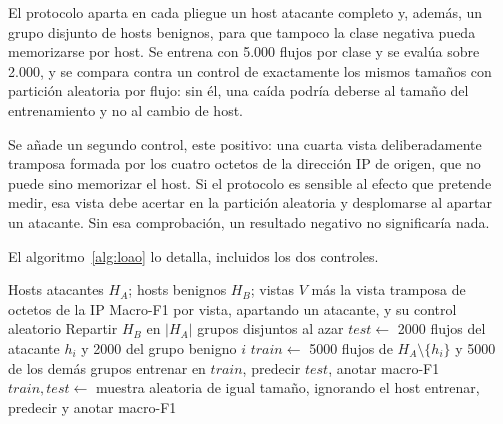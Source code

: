 El protocolo aparta en cada pliegue un host atacante completo y, además, un
grupo disjunto de hosts benignos, para que tampoco la clase negativa pueda
memorizarse por host. Se entrena con 5.000 flujos por clase y se evalúa sobre
2.000, y se compara contra un control de exactamente los mismos tamaños con
partición aleatoria por flujo: sin él, una caída podría deberse al tamaño del
entrenamiento y no al cambio de host.

Se añade un segundo control, este positivo: una cuarta vista deliberadamente
tramposa formada por los cuatro octetos de la dirección IP de origen, que no
puede sino memorizar el host. Si el protocolo es sensible al efecto que pretende
medir, esa vista debe acertar en la partición aleatoria y desplomarse al apartar
un atacante. Sin esa comprobación, un resultado negativo no significaría nada.

El algoritmo~\ref{alg:loao} lo detalla, incluidos los dos controles.

\begin{algorithm}[htbp]
\caption{Leave-one-attacker-out con control negativo y positivo}
\label{alg:loao}
\begin{algorithmic}[1]
\Require Hosts atacantes $H_A$; hosts benignos $H_B$; vistas $V$ más la vista
         tramposa de octetos de la IP
\Ensure Macro-F1 por vista, apartando un atacante, y su control aleatorio
\State Repartir $H_B$ en $|H_A|$ grupos disjuntos al azar
  \State $\mathit{test} \gets$ 2000 flujos del atacante $h_i$ y 2000 del grupo benigno $i$
  \State $\mathit{train} \gets$ 5000 flujos de $H_A \setminus \{h_i\}$ y 5000 de los demás grupos
    \State entrenar en $\mathit{train}$, predecir $\mathit{test}$, anotar macro-F1
  \EndFor
\EndFor
\Statex
{}
  \State $\mathit{train}, \mathit{test} \gets$ muestra aleatoria de igual tamaño, ignorando el host
    \State entrenar, predecir y anotar macro-F1
  \EndFor
\EndFor
\Statex
{}
\end{algorithmic}
\end{algorithm}

